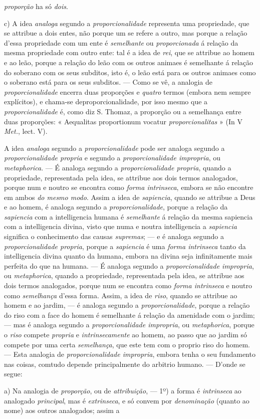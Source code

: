 \emph{proporção} ha só \emph{dois}.\par c) A idea \emph{analoga} segundo a \emph{proporcionalidade} representa uma propriedade, que se attribue a dois entes, não porque um se refere a outro, mas porque a relação d'essa propriedade com um ente é \emph{semelhante} ou \emph{proporcionada} á relação da mesma propriedade com outro ente: tal é a idea de \emph{rei}, que se attribue ao homem e ao leão, porque a relação do leão com os outros animaes é semelhante á relação do soberano com os seus subditos, isto é, o leão está para os outros animaes como o soberano está para os seus subditos. --- Como se vê, a analogia de \emph{proporcionalidade} encerra duas proporções e \emph{quatro} termos (embora nem sempre explícitos), e chama-se deproporcionalidade, por isso mesmo que a \emph{proporcionalidade} é, como diz S. Thomaz, a proporção ou a semelhança entre duas proporções: « Aequalitas proportionum vocatur \emph{proporcionalitas} » (In V \emph{Met.}, lect. V).\par A idea \emph{analoga} segundo a \emph{proporcionalidade} pode ser analoga segundo a \emph{proporcionalidade propria} e segundo a \emph{proporcionalidade impropria}, ou \emph{metaphorica}. --- É analoga segundo a \emph{proporcionalidade propria}, quando a propriedade, representada pela idea, se attribue aos dois termos analogados, porque num e noutro se encontra como \emph{forma intrinseca}, embora se não encontre em ambos \emph{do mesmo modo}. Assim a idea de \emph{sapiencia}, quando se attribue a Deus e ao homem, é analoga segundo a \emph{proporcionalidade}, porque a relação da \emph{sapiencia} com a intelligencia humana é \emph{semelhante} á relação da mesma sapiencia com a intelligencia divina, visto que numa e noutra intelligencia a \emph{sapiencia} significa o conhecimento das causas \emph{supremas}; --- e é analoga segundo a \emph{proporcionalidade propria}, porque a \emph{sapiencia} é uma \emph{forma intrinseca} tanto da intelligencia divina quanto da humana, embora na divina seja infinitamente mais perfeita do que na humana. --- É analoga segundo a \emph{proporcionalidade impropria}, ou \emph{metaphorica}, quando a propriedade, representada pela idea, se attribue aos dois termos analogados, porque num se encontra como \emph{forma intrinseca} e noutro como \emph{semelhança} d'essa forma. Assim, a idea de \emph{riso}, quando se attribue ao homem e ao jardim, --- é analoga segundo a \emph{proporcionalidade}, porque a relação do riso com a face do homem é semelhante á relação da amenidade com o jardim; --- mas é analoga segundo a \emph{proporcionalidade impropria}, ou \emph{metaphorica}, porque o \emph{riso} compete \emph{propria} e \emph{intrinsecamente} ao homem, ao passo que ao jardim só compete por uma certa \emph{semelhança}, que este tem com o proprio riso do homem. --- Esta analogia de \emph{proporcionalidade impropria}, embora tenha o seu fundamento nas coisas, comtudo depende principalmente do arbitrio humano. --- D'onde se segue:\par a) Na analogia de \emph{proporção}, ou de \emph{attribuição}, --- 1º) a forma é \emph{intrinseca} ao analogado \emph{principal}, mas é \emph{extrinseca}, e só convem por \emph{denominação} (quanto ao nome) aos outros analogados; assim a 